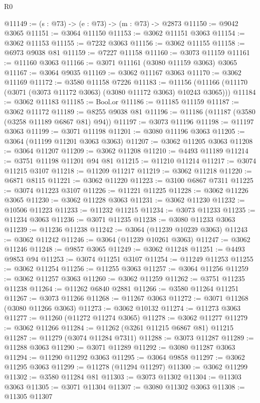 \begin{lexlean}{R0}
\begin{coremodule}
@11149 := (s : @73) -> (e : @73) -> (m : @73) -> @2873
@11150 := @9042 @3065
@11151 := @3064 @11150
@11153 := @3062 @11151 @3063
@11154 := @3062 @11153
@11155 := @7232 @3063
@11156 := @3062 @11155
@11158 := @6973 @9038 @81
@11159 := @7227 @11158
@11160 := @3073 @11159
@11161 := @11160 @3063
@11166 := @3071 @11161 (@3080 @11159 @3063) @3065
@11167 := @3064 @9035
@11169 := @3062 @11167 @3063
@11170 := @3062 @11169
@11172 := @3580 @11158 @7226
@11183 := @11156 (@11166 (@11170 (@3071 (@3073 @11172 @3063) (@3080 @11172 @3063) @10243 @3065)))
@11184 := @3062 @11183
@11185 := Bool.or
@11186 := @11185 @11159
@11187 := @3062 @11172
@11189 := @8255 @9038 @81
@11196 := @11186 (@11187 (@3580 (@3258 @11189 @6867 @81) @94))
@11197 := @3073 @11196
@11198 := @11197 @3063
@11199 := @3071 @11198
@11201 := @3080 @11196 @3063
@11205 := @3064 (@11199 @11201 @3063 @3063)
@11207 := @3062 @11205 @3063
@11208 := @3064 @11207
@11209 := @3062 @11208
@11210 := @4493 @11189
@11214 := @3751 @11198 @11201 @94 @81
@11215 := @11210 @11214
@11217 := @3074 @11215 @3107
@11218 := @11209 @11217
@11219 := @3062 @11218
@11220 := @6871 @8115
@11221 := @3062 @11220
@11223 := @3100 @6867 @7311
@11225 := @3074 @11223 @3107
@11226 := @11221 @11225
@11228 := @3062 @11226 @3065
@11230 := @3062 @11228 @3063
@11231 := @3062 @11230
@11232 := @10506 @11223
@11233 := @11232 @11215
@11234 := @3073 @11233
@11235 := @11234 @3063
@11236 := @3071 @11235
@11238 := @3080 @11233 @3063
@11239 := @11236 @11238
@11242 := @3064 (@11239 @10239 @3063)
@11243 := @3062 @11242
@11246 := @3064 (@11239 @10261 @3063)
@11247 := @3062 @11246
@11248 := @9857 @3065
@11249 := @3062 @11248
@11251 := @4493 @9853 @94
@11253 := @3074 @11251 @3107
@11254 := @11249 @11253
@11255 := @3062 @11254
@11256 := @11255 @3063
@11257 := @3064 @11256
@11259 := @3062 @11257 @3063
@11260 := @3062 @11259
@11262 := @3751 @11235 @11238
@11264 := @11262 @6840 @2881
@11266 := @3580 @11264 @11251
@11267 := @3073 @11266
@11268 := @11267 @3063
@11272 := @3071 @11268 (@3080 @11266 @3063)
@11273 := @3062 @10132
@11274 := @11273 @3063
@11277 := @11260 (@11272 @11274 @3065)
@11278 := @3062 @11277
@11279 := @3062 @11266
@11284 := @11262 (@3261 @11215 @6867 @81) @11215
@11287 := @11279 (@3074 @11284 @7311)
@11288 := @3073 @11287
@11289 := @11288 @3063
@11290 := @3071 @11289
@11292 := @3080 @11287 @3063
@11294 := @11290 @11292 @3063
@11295 := @3064 @9858
@11297 := @3062 @11295 @3063
@11299 := @11278 (@11294 @11297)
@11300 := @3062 @11299
@11302 := @3580 @11284 @81
@11303 := @3073 @11302
@11304 := @11303 @3063
@11305 := @3071 @11304
@11307 := @3080 @11302 @3063
@11308 := @11305 @11307

\end{coremodule}
\end{lexlean}
